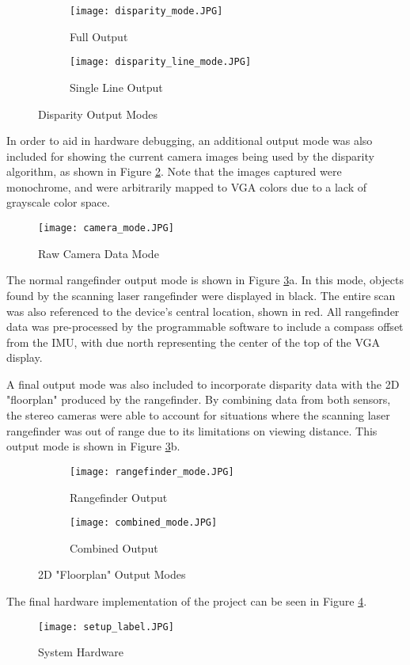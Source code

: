 \begin{figure}[H] 
         \begin{subfigure}[h]{0.5\textwidth}
              \centerline{\texttt{[image: disparity\_mode.JPG]}}
             \caption{Full Output}
         \end{subfigure}
         \begin{subfigure}[h]{0.5\textwidth}
             \centerline{\texttt{[image: disparity\_line\_mode.JPG]}}
             \caption{Single Line Output}
         \end{subfigure}
\caption{Disparity Output Modes}
\label{disparityOutputs}
\end{figure}

In order to aid in hardware debugging, an additional output mode was also included for showing the current camera images being used by the disparity algorithm, as shown in Figure \ref{camOutMode}. Note that the images captured were monochrome, and were arbitrarily mapped to VGA colors due to a lack of grayscale color space.

\begin{figure}[H]  
 	\centerline{
	\texttt{[image: camera\_mode.JPG]}
	}
	\caption{Raw Camera Data Mode}
	\label{camOutMode}
\end{figure} 

The normal rangefinder output mode is shown in Figure \ref{rangeOutputs}a. In this mode, objects found by the scanning laser rangefinder were displayed in black. The entire scan was also referenced to the device's central location, shown in red. All rangefinder data was pre-processed by the programmable software to include a compass offset from the IMU, with due north representing the center of the top of the VGA display.
\par 
A final output mode was also included to incorporate disparity data with the 2D "floorplan" produced by the rangefinder. By combining data from both sensors, the stereo cameras were able to account for situations where the scanning laser rangefinder was out of range due to its limitations on viewing distance. This output mode is shown in Figure \ref{rangeOutputs}b.

\begin{figure}[H] 
         \begin{subfigure}[h]{0.5\textwidth}
              \centerline{\texttt{[image: rangefinder\_mode.JPG]}}
             \caption{Rangefinder Output}
         \end{subfigure}
         \begin{subfigure}[h]{0.5\textwidth}
             \centerline{\texttt{[image: combined\_mode.JPG]}}
             \caption{Combined Output}
         \end{subfigure}
\caption{2D "Floorplan" Output Modes}
\label{rangeOutputs}
\end{figure}

The final hardware implementation of the project can be seen in Figure \ref{finalHW}.

\par\null\par
\begin{figure}[H]  
 	\centerline{
	\texttt{[image: setup\_label.JPG]}
	}
	\caption{System Hardware}
	\label{finalHW}
\end{figure}

